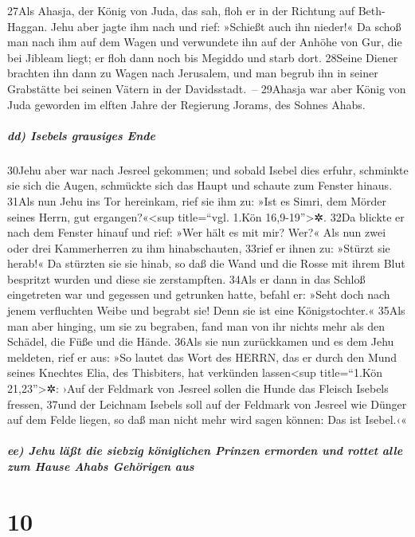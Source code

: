 27Als Ahasja, der König von Juda, das sah, floh er in der Richtung auf
Beth-Haggan. Jehu aber jagte ihm nach und rief: »Schießt auch ihn
nieder!« Da schoß man nach ihm auf dem Wagen und verwundete ihn auf der
Anhöhe von Gur, die bei Jibleam liegt; er floh dann noch bis Megiddo und
starb dort. 28Seine Diener brachten ihn dann zu Wagen nach Jerusalem,
und man begrub ihn in seiner Grabstätte bei seinen Vätern in der
Davidsstadt.~-- 29Ahasja war aber König von Juda geworden im elften
Jahre der Regierung Jorams, des Sohnes Ahabs.

\hypertarget{dd-isebels-grausiges-ende}{%
\subparagraph{dd) Isebels grausiges
Ende}\label{dd-isebels-grausiges-ende}}

30Jehu aber war nach Jesreel gekommen; und sobald Isebel dies erfuhr,
schminkte sie sich die Augen, schmückte sich das Haupt und schaute zum
Fenster hinaus. 31Als nun Jehu ins Tor hereinkam, rief sie ihm zu: »Ist
es Simri, dem Mörder seines Herrn, gut ergangen?«\textless sup
title=``vgl. 1.Kön 16,9-19''\textgreater✲. 32Da blickte er nach dem
Fenster hinauf und rief: »Wer hält es mit mir? Wer?« Als nun zwei oder
drei Kammerherren zu ihm hinabschauten, 33rief er ihnen zu: »Stürzt sie
herab!« Da stürzten sie sie hinab, so daß die Wand und die Rosse mit
ihrem Blut bespritzt wurden und diese sie zerstampften. 34Als er dann in
das Schloß eingetreten war und gegessen und getrunken hatte, befahl er:
»Seht doch nach jenem verfluchten Weibe und begrabt sie! Denn sie ist
eine Königstochter.« 35Als man aber hinging, um sie zu begraben, fand
man von ihr nichts mehr als den Schädel, die Füße und die Hände. 36Als
sie nun zurückkamen und es dem Jehu meldeten, rief er aus: »So lautet
das Wort des HERRN, das er durch den Mund seines Knechtes Elia, des
Thisbiters, hat verkünden lassen\textless sup title=``1.Kön
21,23''\textgreater✲: ›Auf der Feldmark von Jesreel sollen die Hunde das
Fleisch Isebels fressen, 37und der Leichnam Isebels soll auf der
Feldmark von Jesreel wie Dünger auf dem Felde liegen, so daß man nicht
mehr wird sagen können: Das ist Isebel.‹«

\hypertarget{ee-jehu-luxe4uxdft-die-siebzig-kuxf6niglichen-prinzen-ermorden-und-rottet-alle-zum-hause-ahabs-gehuxf6rigen-aus}{%
\subparagraph{ee) Jehu läßt die siebzig königlichen Prinzen ermorden und
rottet alle zum Hause Ahabs Gehörigen
aus}\label{ee-jehu-luxe4uxdft-die-siebzig-kuxf6niglichen-prinzen-ermorden-und-rottet-alle-zum-hause-ahabs-gehuxf6rigen-aus}}

\hypertarget{section-9}{%
\section{10}\label{section-9}}

